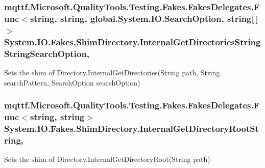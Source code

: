 \hypertarget{class_system_1_1_i_o_1_1_fakes_1_1_shim_directory_a83bd0ba2df431bfab26352f3d8869277}{
\subsubsection[{Internal\-Get\-Directories\-String\-String\-Search\-Option}]{\setlength{\rightskip}{0pt plus 5cm}mqttf.\-Microsoft.\-Quality\-Tools.\-Testing.\-Fakes.\-Fakes\-Delegates.\-Func$<$string, string, global.\-System.\-I\-O.\-Search\-Option, string\mbox{[}$\,$\mbox{]}$>$ System.\-I\-O.\-Fakes.\-Shim\-Directory.\-Internal\-Get\-Directories\-String\-String\-Search\-Option\hspace{0.3cm}{\ttfamily [static]}, {\ttfamily [set]}}}\label{class_system_1_1_i_o_1_1_fakes_1_1_shim_directory_a83bd0ba2df431bfab26352f3d8869277}


Sets the shim of Directory.\-Internal\-Get\-Directories(\-String path, String search\-Pattern, Search\-Option search\-Option)

\hypertarget{class_system_1_1_i_o_1_1_fakes_1_1_shim_directory_a99c071d4e976b8c39eb178c425e9a0e5}{
\subsubsection[{Internal\-Get\-Directory\-Root\-String}]{\setlength{\rightskip}{0pt plus 5cm}mqttf.\-Microsoft.\-Quality\-Tools.\-Testing.\-Fakes.\-Fakes\-Delegates.\-Func$<$string, string$>$ System.\-I\-O.\-Fakes.\-Shim\-Directory.\-Internal\-Get\-Directory\-Root\-String\hspace{0.3cm}{\ttfamily [static]}, {\ttfamily [set]}}}\label{class_system_1_1_i_o_1_1_fakes_1_1_shim_directory_a99c071d4e976b8c39eb178c425e9a0e5}


Sets the shim of Directory.\-Internal\-Get\-Directory\-Root(\-String path)

